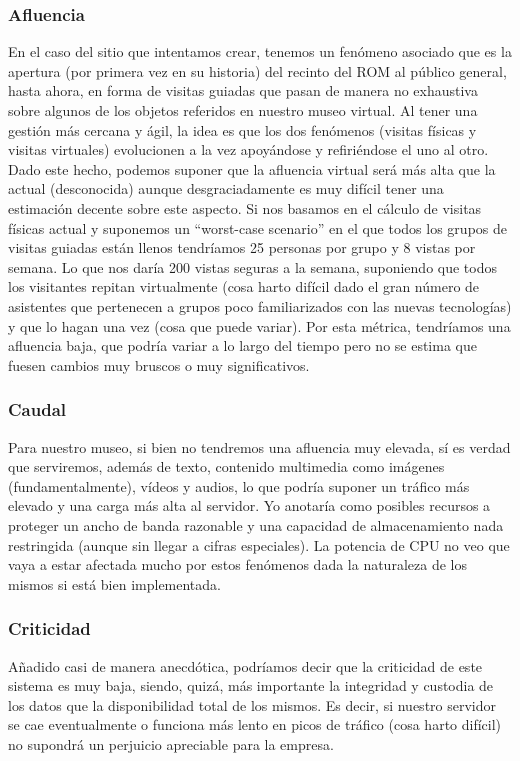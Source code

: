 \subsubsection{Afluencia}
\par En el caso del sitio que intentamos crear, tenemos un fenómeno asociado que es la apertura (por primera vez en su historia) del recinto del ROM al público general, hasta ahora, en forma de visitas guiadas que pasan de manera no exhaustiva sobre algunos de los objetos referidos en nuestro museo virtual. Al tener una gestión más cercana y ágil, la idea es que los dos fenómenos (visitas físicas y visitas virtuales) evolucionen a la vez apoyándose y refiriéndose el uno al otro. Dado este hecho, podemos suponer que la afluencia virtual será más alta que la actual (desconocida) aunque desgraciadamente es muy difícil tener una estimación decente sobre este aspecto. Si nos basamos en el cálculo de visitas físicas actual y suponemos un ``worst-case scenario'' en el que todos los grupos de visitas guiadas están llenos tendríamos 25 personas por grupo y 8 vistas por semana. Lo que nos daría 200 vistas seguras a la semana, suponiendo que todos los visitantes repitan virtualmente (cosa harto difícil dado el gran número de asistentes que pertenecen a grupos poco familiarizados con las nuevas tecnologías) y que lo hagan una vez (cosa que puede variar). Por esta métrica, tendríamos una afluencia baja, que podría variar a lo largo del tiempo pero no se estima que fuesen cambios muy bruscos o muy significativos.

\subsubsection{Caudal}
\par Para nuestro museo, si bien no tendremos una afluencia muy elevada, sí es verdad que serviremos, además de texto, contenido multimedia como imágenes (fundamentalmente), vídeos y audios, lo que podría suponer un tráfico más elevado y una carga más alta al servidor. Yo anotaría como posibles recursos a proteger un ancho de banda razonable y una capacidad de almacenamiento nada restringida (aunque sin llegar a cifras especiales). La potencia de CPU no veo que vaya a estar afectada mucho por estos fenómenos dada la naturaleza de los mismos si está bien implementada.

\subsubsection{Criticidad}
\par Añadido casi de manera anecdótica, podríamos decir que la criticidad de este sistema es muy baja, siendo, quizá, más importante la integridad y custodia de los datos que la disponibilidad total de los mismos. Es decir, si nuestro servidor se cae eventualmente o funciona más lento en picos de tráfico (cosa harto difícil) no supondrá un perjuicio apreciable para la empresa.

